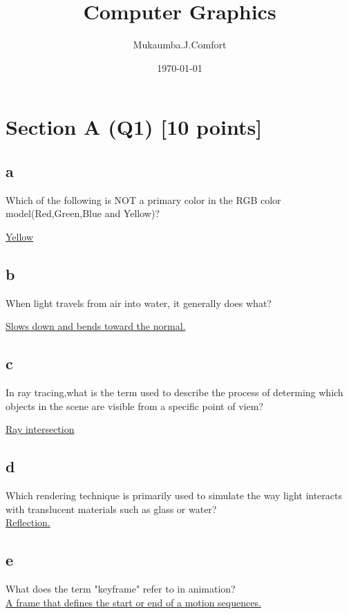 \documentclass{article}
\author{Mukaumba.J.Comfort}
\title{Computer Graphics}
\date{\today}
\begin{document}
\maketitle

\section{Section A (Q1) [10 points]}
\subsection{a}Which of the following is NOT a primary color in the RGB color model(Red,Green,Blue and Yellow)?\par
\underline{Yellow}

\subsection{b}When light travels from air into water, it generally does what?\par
\underline{Slows down and bends toward the normal.}

\subsection{c}In ray tracing,what is the term used to describe the process of determing which objects in the scene are visible from a specific point of viem?\par
\underline{Ray intersection}

\subsection{d}Which rendering technique is primarily used to simulate the way light interacts with translucent materials such as glass or water?\\
\underline{Reflection.}

\subsection{e}What does the term "keyframe" refer to in animation?\\
\underline{A frame that defines the start or end of a motion sequences.}
\end{document}
